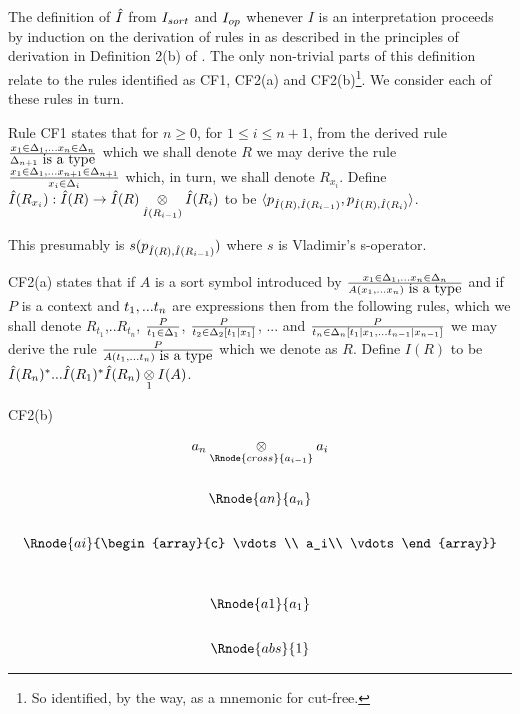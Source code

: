 \newpage
\begin{oldtt}
\note The definition of $\Ihat$ from $\Isort$ and $\Iop$ whenever $I$ is an interpretation proceeds by induction 
on the derivation of rules in  \gatUw 
as described in the principles of derivation in Definition 2(b) of \cite{Cartmell86}. 
The only non-trivial parts of this definition relate to the rules
identified as CF1, CF2(a) and CF2(b)\footnote{So identified, by the way, as a mnemonic for cut-free.}. We consider each of these rules in turn.

\begin{point}
Rule CF1 states that for $n \geq 0$, for $1 \leq i \leq n+1$, from the derived rule 
$\frac{\xDelta{n}}{\isT{\Delta_{n+1}}}$ which we shall denote $R$ 
we may derive the rule
$\frac{\xDelta{n+1}}{\ofT{x_i}{\Delta_i}}$ which, in turn, we shall denote $R_{x_i}$.
Define $\Ihat(R_{x_i}) :  \Ihat(R) \morph \crossx{\Ihat(R)}{\Ihat(R_i)}{\Ihat(R_{i-1})}$
to be $\tuple{p_{\Ihat(R),\Ihat(R_{i-1})},p_{\Ihat(R),\Ihat(R_{i})}}$. 

This presumably is $s(p_{\Ihat(R),\Ihat(R_{i-1})})$ where $s$ is Vladimir's s-operator.
\end{point}
\begin{point}
CF2(a) states that if $A$ is a sort symbol introduced by
$\frac{\xDelta{n}}{\isT{A(\xn)}}$ 
and if $P$ is a context and $\tn$ are expressions then from the following rules, which we shall denote $R_{t_1}$,..$R_{t_n}$,
$\frac{P}{\ofT{t_1}{\Delta_1}}$,
$\frac{P}{\ofT{t_2}{\Delta_2[t_1|x_1]}}$,
... and 
$\frac{P}{\ofT{t_n}{\Delta_n[t_1|x_1,...t_{n-1}|x_{n-1}]}}$
we may derive the rule
$\frac{P}{\isT{A(t_1,...t_n)}}$ which we denote as $R$. 
Define $I(R)$ to be $\Ihat(R_n)^*...\Ihat(R_1)^*\crossx{\Ihat(R_n)}{I(A)}{1}$.
\end{point}
\begin{point}
CF2(b) 
\end{point}
\end{oldtt}

\begin{oldtt}
\begin{displaymath}
\begin{array}{c}
\crossx{a_n}{a_i}{\Rnode{cross}{a_{i-1}}} \\[0.9cm]
\Rnode{an}{a_n}\\[0.7cm]
\Rnode{ai}{\begin{array}{c}
\vdots\\
a_i\\
\vdots
\end{array}} \\[1.1cm]
\Rnode{a1}{a_1}\\[0.7cm]
\Rnode{abs}{1}
\end{array}
\end{displaymath}
\end{oldtt}

